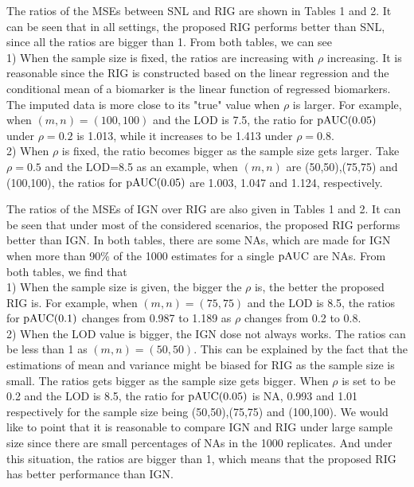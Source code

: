 \documentclass[a4,11pt,epsf, amssymb]{article}
\begin{document}
The ratios of the MSEs between SNL and RIG are shown in Tables 1 and  2. It can  be seen that in all settings, the proposed RIG performs better than SNL, since all the ratios are bigger than 1.
From both tables, we can see \\
1) When the sample size is fixed, the ratios are increasing with $\rho$ increasing. It is reasonable since the RIG is constructed based on the linear regression and the conditional mean of a biomarker is the linear function of
regressed biomarkers.  The imputed data is more close to its "true" value when $\rho$ is larger.
For example, when $(m,n)=(100,100)$ and the LOD is 7.5, the ratio for $\hbox {pAUC}(0.05)$ under $\rho=0.2$ is 1.013, while it increases to be 1.413 under $\rho=0.8$.\\
2) When $\rho$ is fixed, the ratio becomes bigger as the sample size gets larger. Take $\rho = 0.5$ and the LOD=8.5  as an example, when $(m,n)$ are (50,50),(75,75) and (100,100), the ratios for $\hbox {pAUC}(0.05)$ are 1.003, 1.047 and 1.124, respectively.

The ratios of the MSEs of IGN over RIG are also given in Tables 1 and  2. It can  be seen that under  most of the considered scenarios, the proposed RIG performs better than IGN.
In both tables, there are some NAs, which are made for IGN when more than 90\% of the 1000 estimates for a single $\hbox {pAUC}$ are NAs.
From both tables, we find that \\
1) When the sample size is given, the bigger the $\rho$ is, the better the proposed RIG is.
For example, when $(m,n)=(75,75)$ and the LOD is 8.5, the ratios for $\hbox {pAUC}(0.1)$ changes from 0.987 to 1.189 as $\rho$ changes from 0.2 to 0.8.  \\
2) When the LOD value is bigger, the IGN dose not always works. The ratios can be less than 1 as $(m,n) = (50,50)$.
This can be explained by the fact that the estimations of mean and variance might be biased for RIG as the sample size is small.
The ratios gets bigger as the sample size gets bigger. When $\rho$ is set to be 0.2 and the LOD is 8.5, the ratio for $\hbox {pAUC}(0.05)$ is NA, 0.993 and 1.01 respectively for the sample size being (50,50),(75,75) and (100,100).
We would like to point that it is reasonable to compare IGN and RIG under large sample size since there are small percentages of NAs in the 1000 replicates.  And under this situation, the ratios are bigger than 1, which means that the proposed RIG has better performance than IGN.
\end{document}
